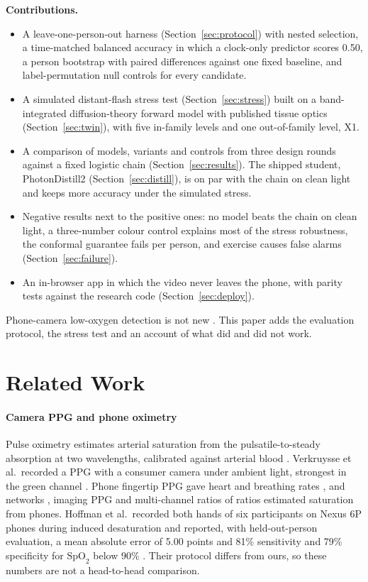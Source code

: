 \documentclass[11pt,letterpaper]{article}
\newcommand{\spo}{\ensuremath{\mathrm{SpO}_2}}
\begin{document}
\textbf{Contributions.}
\begin{itemize}
\item A leave-one-person-out harness (Section~\ref{sec:protocol}) with nested selection, a time-matched balanced accuracy in which a clock-only predictor scores 0.50, a person bootstrap with paired differences against one fixed baseline, and label-permutation null controls for every candidate.
\item A simulated distant-flash stress test (Section~\ref{sec:stress}) built on a band-integrated diffusion-theory forward model with published tissue optics (Section~\ref{sec:twin}), with five in-family levels and one out-of-family level, X1.
\item A comparison of \NumModels{} models, variants and controls from three design rounds against a fixed logistic chain (Section~\ref{sec:results}). The shipped student, PhotonDistill2 (Section~\ref{sec:distill}), is on par with the chain on clean light and keeps more accuracy under the simulated stress.
\item Negative results next to the positive ones: no model beats the chain on clean light, a three-number colour control explains most of the stress robustness, the conformal guarantee fails per person, and exercise causes false alarms (Section~\ref{sec:failure}).
\item An in-browser app in which the video never leaves the phone, with parity tests against the research code (Section~\ref{sec:deploy}).
\end{itemize}
Phone-camera low-oxygen detection is not new \cite{hoffman2022,ding2019,tian2022,sun2021}. This paper adds the evaluation protocol, the stress test and an account of what did and did not work.


\section{Related Work}\label{sec:related}
\paragraph{Camera PPG and phone oximetry} Pulse oximetry estimates arterial saturation from the pulsatile-to-steady absorption at two wavelengths, calibrated against arterial blood \cite{allen2007}. Verkruysse et al.\ recorded a PPG with a consumer camera under ambient light, strongest in the green channel \cite{verkruysse2008}. Phone fingertip PPG gave heart and breathing rates \cite{scully2012}, and networks \cite{ding2019}, imaging PPG \cite{sun2021} and multi-channel ratios of ratios \cite{tian2022} estimated saturation from phones. Hoffman et al.\ recorded both hands of six participants on Nexus 6P phones during induced desaturation and reported, with held-out-person evaluation, a mean absolute error of 5.00 points and 81\% sensitivity and 79\% specificity for \spo{} below 90\% \cite{hoffman2022}. Their protocol differs from ours, so these numbers are not a head-to-head comparison.
\end{document}
